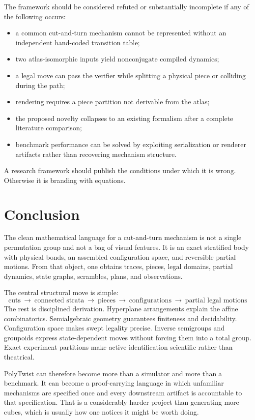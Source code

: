 \documentclass[11pt,openany]{book}
\theoremstyle{polyplain}
\theoremstyle{polydef}
\begin{document}
The framework should be considered refuted or substantially incomplete if any of the following occurs:
\begin{itemize}
  \item a common cut-and-turn mechanism cannot be represented without an independent hand-coded transition table;
  \item two atlas-isomorphic inputs yield nonconjugate compiled dynamics;
  \item a legal move can pass the verifier while splitting a physical piece or colliding during the path;
  \item rendering requires a piece partition not derivable from the atlas;
  \item the proposed novelty collapses to an existing formalism after a complete literature comparison;
  \item benchmark performance can be solved by exploiting serialization or renderer artifacts rather than recovering mechanism structure.
\end{itemize}

A research framework should publish the conditions under which it is wrong. Otherwise it is branding with equations.

\chapter{Conclusion}

The clean mathematical language for a cut-and-turn mechanism is not a single permutation group and not a bag of visual features. It is an exact stratified body with physical bonds, an assembled configuration space, and reversible partial motions. From that object, one obtains traces, pieces, legal domains, partial dynamics, state graphs, scrambles, plans, and observations.

The central structural move is simple:
\[
\boxed{
\text{cuts}\ \longrightarrow\ \text{connected strata}\ \longrightarrow\
\text{pieces}\ \longrightarrow\ \text{configurations}\ \longrightarrow\
\text{partial legal motions}
}
\]
The rest is disciplined derivation. Hyperplane arrangements explain the affine combinatorics. Semialgebraic geometry guarantees finiteness and decidability. Configuration space makes swept legality precise. Inverse semigroups and groupoids express state-dependent moves without forcing them into a total group. Exact experiment partitions make active identification scientific rather than theatrical.

PolyTwist can therefore become more than a simulator and more than a benchmark. It can become a proof-carrying language in which unfamiliar mechanisms are specified once and every downstream artifact is accountable to that specification. That is a considerably harder project than generating more cubes, which is usually how one notices it might be worth doing.
\end{document}
